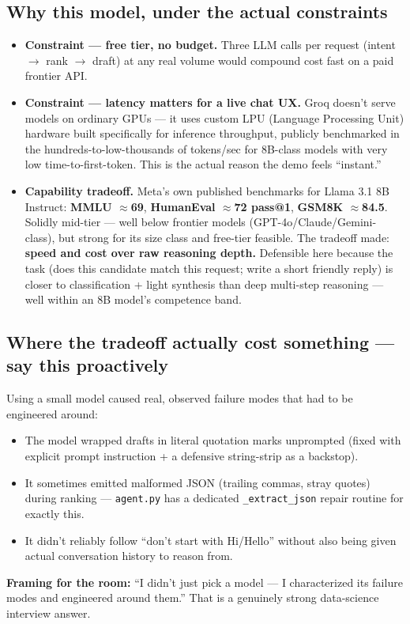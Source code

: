 \documentclass[11pt, a4paper]{article}
\begin{document}
\subsection{Why this model, under the actual constraints}
\begin{itemize}
    \item \textbf{Constraint --- free tier, no budget.} Three LLM calls per request (intent $\to$ rank $\to$ draft) at any real volume would compound cost fast on a paid frontier API.
    \item \textbf{Constraint --- latency matters for a live chat UX.} Groq doesn't serve models on ordinary GPUs --- it uses custom LPU (Language Processing Unit) hardware built specifically for inference throughput, publicly benchmarked in the hundreds-to-low-thousands of tokens/sec for 8B-class models with very low time-to-first-token. This is the actual reason the demo feels ``instant.''
    \item \textbf{Capability tradeoff.} Meta's own published benchmarks for Llama 3.1 8B Instruct: \textbf{MMLU $\approx$69}, \textbf{HumanEval $\approx$72 pass@1}, \textbf{GSM8K $\approx$84.5}. Solidly mid-tier --- well below frontier models (GPT-4o/Claude/Gemini-class), but strong for its size class and free-tier feasible. The tradeoff made: \textbf{speed and cost over raw reasoning depth.} Defensible here because the task (does this candidate match this request; write a short friendly reply) is closer to classification + light synthesis than deep multi-step reasoning --- well within an 8B model's competence band.
\end{itemize}

\subsection{Where the tradeoff actually cost something --- say this proactively}
Using a small model caused real, observed failure modes that had to be engineered around:
\begin{itemize}
    \item The model wrapped drafts in literal quotation marks unprompted (fixed with explicit prompt instruction + a defensive string-strip as a backstop).
    \item It sometimes emitted malformed JSON (trailing commas, stray quotes) during ranking --- \texttt{agent.py} has a dedicated \texttt{\_extract\_json} repair routine for exactly this.
    \item It didn't reliably follow ``don't start with Hi/Hello'' without also being given actual conversation history to reason from.
\end{itemize}
\textbf{Framing for the room:} ``I didn't just pick a model --- I characterized its failure modes and engineered around them.'' That is a genuinely strong data-science interview answer.
\end{document}
